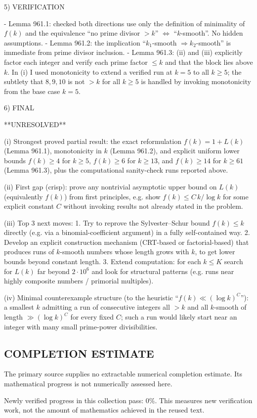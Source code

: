 5) VERIFICATION

- Lemma 961.1: checked both directions use only the definition of minimality of $f(k)$ and the equivalence “no prime divisor $>k$” $\Leftrightarrow$ “$k$-smooth”. No hidden assumptions.
- Lemma 961.2: the implication “$k_1$-smooth $\Rightarrow k_2$-smooth” is immediate from prime divisor inclusion.
- Lemma 961.3: (ii) and (iii) explicitly factor each integer and verify each prime factor $\le k$ and that the block lies above $k$. In (i) I used monotonicity to extend a verified run at $k=5$ to all $k\ge 5$; the subtlety that $8,9,10$ is not $>k$ for all $k\ge 5$ is handled by invoking monotonicity from the base case $k=5$.

6) FINAL

**UNRESOLVED**

(i) Strongest proved partial result: the exact reformulation $f(k)=1+L(k)$ (Lemma 961.1), monotonicity in $k$ (Lemma 961.2), and explicit uniform lower bounds $f(k)\ge 4$ for $k\ge 5$, $f(k)\ge 6$ for $k\ge 13$, and $f(k)\ge 14$ for $k\ge 61$ (Lemma 961.3), plus the computational sanity-check runs reported above.

(ii) First gap (crisp): prove any nontrivial asymptotic upper bound on $L(k)$ (equivalently $f(k)$) from first principles, e.g. show $f(k)\le C\,k/\log k$ for some explicit constant $C$ without invoking results not already stated in the problem.

(iii) Top 3 next moves:
1. Try to reprove the Sylvester--Schur bound $f(k)\le k$ directly (e.g. via a binomial-coefficient argument) in a fully self-contained way.
2. Develop an explicit construction mechanism (CRT-based or factorial-based) that produces runs of $k$-smooth numbers whose length grows with $k$, to get lower bounds beyond constant length.
3. Extend computation: for each $k\le K$ search for $L(k)$ far beyond $2\cdot 10^6$ and look for structural patterns (e.g. runs near highly composite numbers / primorial multiples).

(iv) Minimal counterexample structure (to the heuristic “$f(k)\ll (\log k)^C$”): a smallest $k$ admitting a run of consecutive integers all $>k$ and all $k$-smooth of length $\gg (\log k)^C$ for every fixed $C$; such a run would likely start near an integer with many small prime-power divisibilities.




\subsection*{COMPLETION ESTIMATE}
The primary source supplies no extractable numerical completion estimate. Its mathematical progress is not numerically assessed here.

Newly verified progress in this collection pass: $0\%$. This measures new verification work, not the amount of mathematics achieved in the reused text.
